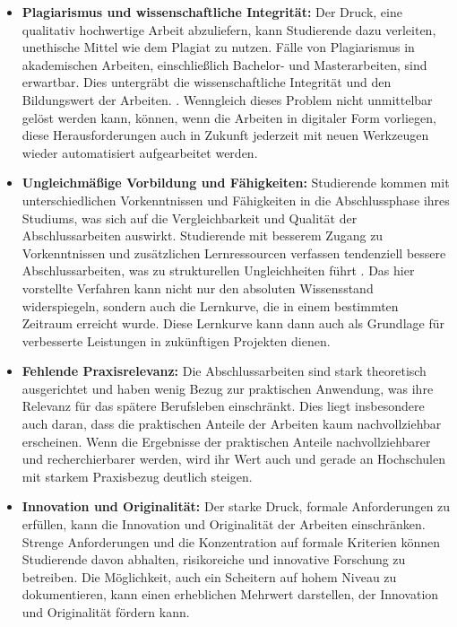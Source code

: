 \documentclass[conference]{IEEEtran}
\begin{document}
\begin{itemize}[leftmargin=*]
    \item \textbf{Plagiarismus und wissenschaftliche Integrität:}
    \newline Der Druck, eine qualitativ hochwertige Arbeit abzuliefern, kann Studierende dazu verleiten, unethische Mittel wie dem Plagiat zu nutzen. Fälle von Plagiarismus in akademischen Arbeiten, einschließlich Bachelor- und Masterarbeiten, sind erwartbar. Dies untergräbt die wissenschaftliche Integrität und den Bildungswert der Arbeiten. \cite{Larsson2013}. Wenngleich dieses Problem nicht unmittelbar gelöst werden kann, können, wenn die Arbeiten in digitaler Form vorliegen, diese Herausforderungen auch in Zukunft jederzeit mit neuen Werkzeugen wieder automatisiert aufgearbeitet werden. 

    \item \textbf{Ungleichmäßige Vorbildung und Fähigkeiten:}
    \newline Studierende kommen mit unterschiedlichen Vorkenntnissen und Fähigkeiten in die Abschlussphase ihres Studiums, was sich auf die Vergleichbarkeit und Qualität der Abschlussarbeiten auswirkt.
        Studierende mit besserem Zugang zu Vorkenntnissen und zusätzlichen Lernressourcen verfassen tendenziell bessere Abschlussarbeiten, was zu strukturellen Ungleichheiten führt \cite{Evaluating2022}. Das hier vorstellte Verfahren kann nicht nur den absoluten Wissensstand widerspiegeln, sondern auch die Lernkurve, die in einem bestimmten Zeitraum erreicht wurde. Diese Lernkurve kann dann auch als Grundlage für verbesserte Leistungen in zukünftigen Projekten dienen.

    \item \textbf{Fehlende Praxisrelevanz:}
    \newline Die Abschlussarbeiten sind stark theoretisch ausgerichtet und haben wenig Bezug zur praktischen Anwendung, was ihre Relevanz für das spätere Berufsleben einschränkt. Dies liegt insbesondere auch daran, dass die praktischen Anteile der Arbeiten kaum nachvollziehbar erscheinen. Wenn die Ergebnisse der praktischen Anteile nachvollziehbarer und recherchierbarer werden, wird ihr Wert auch und gerade an Hochschulen mit starkem Praxisbezug deutlich steigen.

    \item \textbf{Innovation und Originalität:}
    \newline Der starke Druck, formale Anforderungen zu erfüllen, kann die Innovation und Originalität der Arbeiten einschränken.
    Strenge Anforderungen und die Konzentration auf formale Kriterien können Studierende davon abhalten, risikoreiche und innovative Forschung zu betreiben.
        Die Möglichkeit, auch ein Scheitern auf hohem Niveau zu dokumentieren, kann einen erheblichen Mehrwert darstellen, der Innovation und Originalität fördern kann.
\end{itemize}
\end{document}
